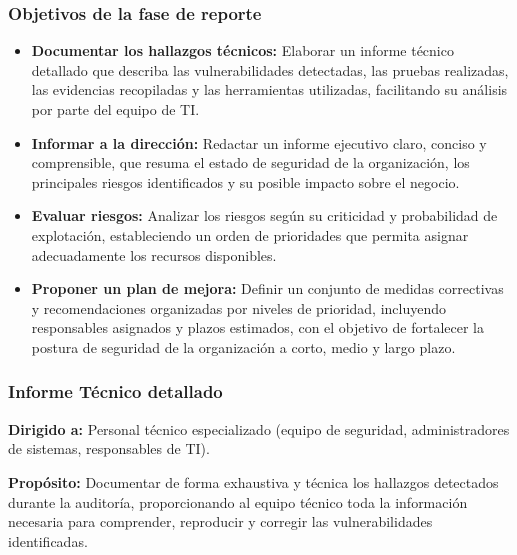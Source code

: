 \documentclass[a4paper, 11pt]{article}
\begin{document}
\subsubsection{Objetivos de la fase de reporte}
\begin{itemize}
\item \textbf{Documentar los hallazgos técnicos:} Elaborar un informe técnico detallado que describa las vulnerabilidades detectadas, las pruebas realizadas, las evidencias recopiladas y las herramientas utilizadas, facilitando su análisis por parte del equipo de TI.

\item \textbf{Informar a la dirección:} Redactar un informe ejecutivo claro, conciso y comprensible, que resuma el estado de seguridad de la organización, los principales riesgos identificados y su posible impacto sobre el negocio.

\item \textbf{Evaluar riesgos:} Analizar los riesgos según su criticidad y probabilidad de explotación, estableciendo un orden de prioridades que permita asignar adecuadamente los recursos disponibles.

\item \textbf{Proponer un plan de mejora:} Definir un conjunto de medidas correctivas y recomendaciones organizadas por niveles de prioridad, incluyendo responsables asignados y plazos estimados, con el objetivo de fortalecer la postura de seguridad de la organización a corto, medio y largo plazo.
\end{itemize}
\vspace{0.5cm}



\subsubsection{Informe Técnico detallado}

\textbf{Dirigido a:} Personal técnico especializado (equipo de seguridad, administradores de sistemas, responsables de TI).

\textbf{Propósito:} Documentar de forma exhaustiva y técnica los hallazgos detectados durante la auditoría, proporcionando al equipo técnico toda la información necesaria para comprender, reproducir y corregir las vulnerabilidades identificadas.
\end{document}
